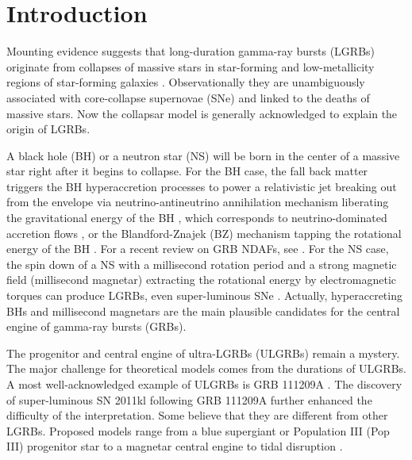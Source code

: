 \documentclass[twocolumn]{aastex6}
\begin{document}

\section{Introduction}

Mounting evidence suggests that long-duration gamma-ray bursts (LGRBs) originate from collapses of massive stars in star-forming and low-metallicity regions of star-forming galaxies \citep[see reviews by][]{Woosley2006,Kumar2015}. Observationally they are unambiguously associated with core-collapse supernovae (SNe) and linked to the deaths of massive stars. Now the collapsar model \citep[see e.g.,][]{Woosley1993,MacFadyen1999,Woosley2002,Zhang2004,Woosley2012} is generally acknowledged to explain the origin of LGRBs.

A black hole (BH) or a neutron star (NS) will be born in the center of a massive star right after it begins to collapse. For the BH case, the fall back matter triggers the BH hyperaccretion processes to power a relativistic jet breaking out from the envelope via neutrino-antineutrino annihilation mechanism liberating the gravitational energy of the BH \citep[e.g.,][]{Ruffert1997,Rosswog2003}, which corresponds to neutrino-dominated accretion flows \citep{Popham1999,Di Matteo2002,Gu2006,Liu2007,Kawanaka2007,Zalamea2011,Xue2013,Liu2016,Song2016}, or the Blandford-Znajek (BZ) mechanism tapping the rotational energy of the BH \citep[e.g.,][]{Blandford1977,Lee2000a,Lee2000b,Wu2013,Lei2013,Lei2017,Liu2015}. For a recent review on GRB NDAFs, see \cite{Liu2017}.
For the NS case, the spin down of a NS with a millisecond rotation period and a strong magnetic field (millisecond magnetar) extracting the rotational energy by electromagnetic torques can produce LGRBs, even super-luminous SNe \citep[e.g.,][]{Duncan1992,Usov1992,Dai1998a,Dai1998b,Kluzniak1998,Zhang2001,Dai2006,Metzger2011,Metzger2015,Lv2014,Lv2015}. Actually, hyperaccreting BHs and millisecond magnetars are the main plausible candidates for the central engine of gamma-ray bursts (GRBs).

The progenitor and central engine of ultra-LGRBs (ULGRBs) remain a mystery. The major challenge for theoretical models comes from the durations of ULGRBs. A most well-acknowledged example of ULGRBs is GRB 111209A \citep[e.g.,][]{Gendre2013,Levan2014,Zhang2014}. The discovery of super-luminous SN 2011kl following GRB 111209A \citep{Greiner2015} further enhanced the difficulty of the interpretation. Some believe that they are different from other LGRBs. Proposed models range from a blue supergiant or Population III (Pop III) progenitor star to a magnetar central engine to tidal disruption \citep{Gendre2013,Levan2014,Zhang2014,Greiner2015,Ioka2016}.
\end{document}
